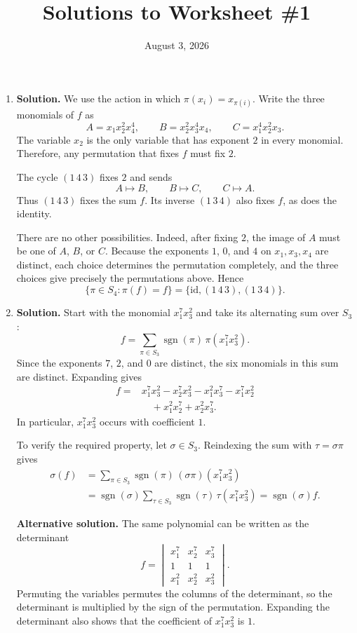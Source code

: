 \documentclass{article}
\title{Solutions to Worksheet \#1}
\author{}
\date{August 3, 2026}
\begin{document}
\maketitle
\begin{enumerate}
\item \textbf{Solution.}
We use the action in which $\pi(x_i)=x_{\pi(i)}$.  Write the three
monomials of $f$ as
\[
A=x_1x_2^2x_4^4,\qquad
B=x_2^2x_3^4x_4,\qquad
C=x_1^4x_2^2x_3.
\]
The variable $x_2$ is the only variable that has exponent $2$ in every
monomial.  Therefore, any permutation that fixes $f$ must fix $2$.

The cycle $(1\,4\,3)$ fixes $2$ and sends
\[
A\longmapsto B,\qquad B\longmapsto C,\qquad C\longmapsto A.
\]
Thus $(1\,4\,3)$ fixes the sum $f$.  Its inverse $(1\,3\,4)$ also fixes
$f$, as does the identity.

There are no other possibilities.  Indeed, after fixing $2$, the image of
$A$ must be one of $A$, $B$, or $C$.  Because the exponents $1$, $0$, and
$4$ on $x_1,x_3,x_4$ are distinct, each choice determines the permutation
completely, and the three choices give precisely the permutations above.
Hence
\[
\boxed{\{\pi\in S_4:\pi(f)=f\}
 =\{\mathrm{id},(1\,4\,3),(1\,3\,4)\}.}
\]

\item \textbf{Solution.}
Start with the monomial $x_1^7x_3^2$ and take its alternating sum over
$S_3$:
\[
f=\sum_{\pi\in S_3}\operatorname{sgn}(\pi)\,
       \pi(x_1^7x_3^2).
\]
Since the exponents $7$, $2$, and $0$ are distinct, the six monomials in
this sum are distinct.  Expanding gives
\[
\begin{aligned}
f={}&x_1^7x_3^2-x_2^7x_3^2-x_1^2x_3^7-x_1^7x_2^2\\
   &\quad+x_1^2x_2^7+x_2^2x_3^7.
\end{aligned}
\]
In particular, $x_1^7x_3^2$ occurs with coefficient $1$.

To verify the required property, let $\sigma\in S_3$.  Reindexing the sum
with $\tau=\sigma\pi$ gives
\[
\begin{aligned}
\sigma(f)
 &=\sum_{\pi\in S_3}\operatorname{sgn}(\pi)\,
      (\sigma\pi)(x_1^7x_3^2)\\
 &=\operatorname{sgn}(\sigma)
   \sum_{\tau\in S_3}\operatorname{sgn}(\tau)\,
      \tau(x_1^7x_3^2)
 =\operatorname{sgn}(\sigma)f.
\end{aligned}
\]

\medskip
\noindent\textbf{Alternative solution.}
The same polynomial can be written as the determinant
\[
f=
\begin{vmatrix}
x_1^7 & x_2^7 & x_3^7\\
1     & 1     & 1\\
x_1^2 & x_2^2 & x_3^2
\end{vmatrix}.
\]
Permuting the variables permutes the columns of the determinant, so the
determinant is multiplied by the sign of the permutation.  Expanding the
determinant also shows that the coefficient of $x_1^7x_3^2$ is $1$.


\end{enumerate}
\end{document}
